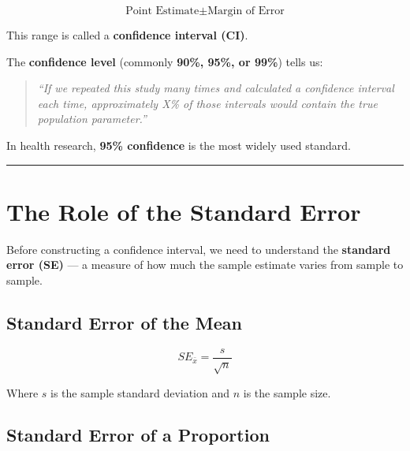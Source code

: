 \documentclass[
  12pt,
  letterpaper,
]{book}
\begin{document}
\[\text{Point Estimate} \pm \text{Margin of Error}\]

This range is called a \textbf{confidence interval (CI)}.

\begin{tcolorbox}[enhanced jigsaw, arc=.35mm, bottomrule=.15mm, bottomtitle=1mm, breakable, colback=white, colbacktitle=quarto-callout-important-color!10!white, colframe=quarto-callout-important-color-frame, coltitle=black, left=2mm, leftrule=.75mm, opacityback=0, opacitybacktitle=0.6, rightrule=.15mm, title={🔑 Key Concept: Confidence Level}, titlerule=0mm, toprule=.15mm, toptitle=1mm]

The \textbf{confidence level} (commonly \textbf{90\%, 95\%, or 99\%})
tells us:

\begin{quote}
\emph{``If we repeated this study many times and calculated a confidence
interval each time, approximately X\% of those intervals would contain
the true population parameter.''}
\end{quote}

In health research, \textbf{95\% confidence} is the most widely used
standard.

\end{tcolorbox}

\begin{center}\rule{0.5\linewidth}{0.5pt}\end{center}

\section{The Role of the Standard
Error}\label{the-role-of-the-standard-error}

Before constructing a confidence interval, we need to understand the
\textbf{standard error (SE)} --- a measure of how much the sample
estimate varies from sample to sample.

\subsection{Standard Error of the
Mean}\label{standard-error-of-the-mean}

\[SE_{\bar{x}} = \frac{s}{\sqrt{n}}\]

Where \(s\) is the sample standard deviation and \(n\) is the sample
size.

\subsection{Standard Error of a
Proportion}\label{standard-error-of-a-proportion}
\end{document}

